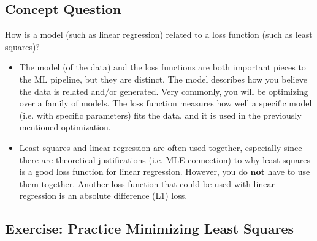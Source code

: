 \documentclass[11pt,letterpaper]{article}
\begin{document}
\subsection{Concept Question}
How is a model (such as linear regression) related to a loss function (such as least squares)?

\begin{itemize}
    \item The model (of the data) and the loss functions are both important pieces to the ML pipeline, but they are distinct. The model describes how you believe the data is related and/or generated. Very commonly, you will be optimizing over a family of models. The loss function measures how well a specific model (i.e. with specific parameters) fits the data, and it is used in the previously mentioned optimization. 
    \item Least squares and linear regression are often used together, especially since there are theoretical justifications (i.e. MLE connection) to why least squares is a good loss function for linear regression. However, you do $\mathbf{not}$ have to use them together. Another loss function that could be used with linear regression is an absolute difference (L1) loss.
\end{itemize}
\vspace{25mm}


\subsection{Exercise: Practice Minimizing Least Squares}
\end{document}
